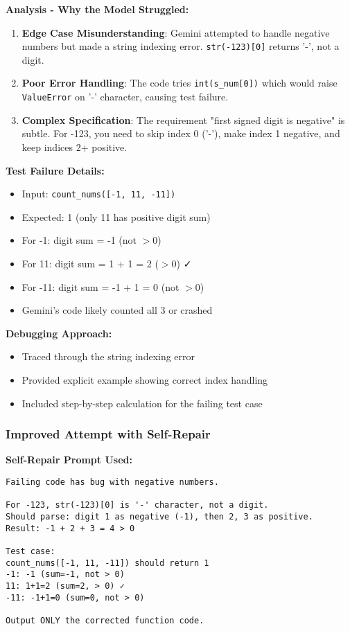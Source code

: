\documentclass[11pt]{article}
\begin{document}
\textbf{Analysis - Why the Model Struggled:}
\begin{enumerate}
    \item \textbf{Edge Case Misunderstanding}: Gemini attempted to handle negative numbers but made a string indexing error. \texttt{str(-123)[0]} returns '-', not a digit.
    
    \item \textbf{Poor Error Handling}: The code tries \texttt{int(s\_num[0])} which would raise \texttt{ValueError} on '-' character, causing test failure.
    
    \item \textbf{Complex Specification}: The requirement "first signed digit is negative" is subtle. For -123, you need to skip index 0 ('-'), make index 1 negative, and keep indices 2+ positive.
\end{enumerate}

\textbf{Test Failure Details:}
\begin{itemize}
    \item Input: \texttt{count\_nums([-1, 11, -11])}
    \item Expected: 1 (only 11 has positive digit sum)
    \item For -1: digit sum = -1 (not $> 0$)
    \item For 11: digit sum = 1 + 1 = 2 ($> 0$) ✓
    \item For -11: digit sum = -1 + 1 = 0 (not $> 0$)
    \item Gemini's code likely counted all 3 or crashed
\end{itemize}

\textbf{Debugging Approach:}
\begin{itemize}
    \item Traced through the string indexing error
    \item Provided explicit example showing correct index handling
    \item Included step-by-step calculation for the failing test case
\end{itemize}

\subsubsection{Improved Attempt with Self-Repair}

\textbf{Self-Repair Prompt Used:}
\begin{lstlisting}
Failing code has bug with negative numbers.

For -123, str(-123)[0] is '-' character, not a digit.
Should parse: digit 1 as negative (-1), then 2, 3 as positive.
Result: -1 + 2 + 3 = 4 > 0

Test case:
count_nums([-1, 11, -11]) should return 1
-1: -1 (sum=-1, not > 0)
11: 1+1=2 (sum=2, > 0) ✓
-11: -1+1=0 (sum=0, not > 0)

Output ONLY the corrected function code.
\end{lstlisting}
\end{document}
